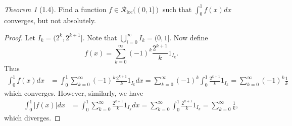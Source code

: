 \documentclass[12pt]{article}
\theoremstyle{remark}
\theoremstyle{named}
\newtheorem*{theorem}{Theorem}
\begin{document}
\begin{theorem}[1.4]
    Find a function \(f \in \mathcal{R}_{\text{loc}}((0, 1])\) such that \(\int_{0}^{1} f(x) dx\) converges, but not absolutely.
\end{theorem}

\begin{proof}
    Let \(I_k = (2^k, 2^{k + 1}]\). Note that \(\bigcup_{i = 0}^\infty I_k = (0, 1]\). Now define 
    \[f(x) = \sum_{k = 0}^\infty (-1)^k\frac{2^{k + 1}}{k} 1_{I_k}.\]
    Thus
    \begin{align*}
        \int_{0}^{1} f(x) dx &= \int_{0}^{1} \sum_{k = 0}^\infty (-1)^k\frac{2^{k + 1}}{k} 1_{I_k} dx = \sum_{k = 0}^\infty (-1)^k \int_{0}^{1}\frac{2^{k + 1}}{k} 1_{I_k} = \sum_{k = 0}^\infty (-1)^k\frac{1}{k}
    \end{align*}
    which converges. However, similarly, we have
    \begin{align*}
        \int_{0}^{1} |f(x)| dx &= \int_{0}^{1} \sum_{k = 0}^\infty \frac{2^{k + 1}}{k} 1_{I_k} dx = \sum_{k = 0}^\infty \int_{0}^{1}\frac{2^{k + 1}}{k} 1_{I_k} = \sum_{k = 0}^\infty \frac{1}{k},
    \end{align*}
    which diverges.
\end{proof}
\end{document}
